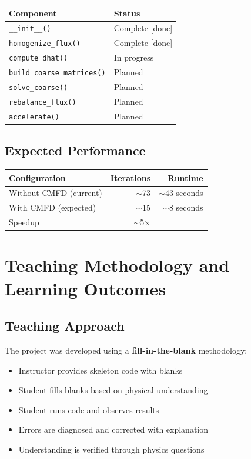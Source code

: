 \documentclass[12pt,a4paper]{article}
\begin{document}
\begin{center}
\begin{tabular}{ll}
\toprule
\textbf{Component} & \textbf{Status} \\
\midrule
\texttt{\_\_init\_\_()} & Complete [done] \\
\texttt{homogenize\_flux()} & Complete [done] \\
\texttt{compute\_dhat()} & In progress \\
\texttt{build\_coarse\_matrices()} & Planned \\
\texttt{solve\_coarse()} & Planned \\
\texttt{rebalance\_flux()} & Planned \\
\texttt{accelerate()} & Planned \\
\bottomrule
\end{tabular}
\end{center}

\subsection{Expected Performance}

\begin{center}
\begin{tabular}{lrr}
\toprule
\textbf{Configuration} & \textbf{Iterations} & \textbf{Runtime} \\
\midrule
Without CMFD (current) & $\sim$73 & $\sim$43 seconds \\
With CMFD (expected) & $\sim$15 & $\sim$8 seconds \\
Speedup & $\sim$5$\times$ & \\
\bottomrule
\end{tabular}
\end{center}

\section{Teaching Methodology and Learning Outcomes}

\subsection{Teaching Approach}

The project was developed using a \textbf{fill-in-the-blank} methodology:
\begin{itemize}
    \item Instructor provides skeleton code with blanks
    \item Student fills blanks based on physical understanding
    \item Student runs code and observes results
    \item Errors are diagnosed and corrected with explanation
    \item Understanding is verified through physics questions
\end{itemize}
\end{document}

